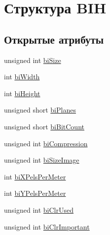 \hypertarget{struct_b_i_h}{\section{Структура B\+I\+H}
\label{struct_b_i_h}
}
\subsection*{Открытые атрибуты}
\begin{DoxyCompactItemize}
\item 
unsigned int \hyperlink{struct_b_i_h_a07c713ee07612e15f4fdca57077a8319}{bi\+Size}
\item 
int \hyperlink{struct_b_i_h_ad3ee37b4e7c1dd70c0b78deb59a0dbc6}{bi\+Width}
\item 
int \hyperlink{struct_b_i_h_a02827f70f0a626b10ea29076436704bc}{bi\+Height}
\item 
unsigned short \hyperlink{struct_b_i_h_aaa13a4d8e94f79eb8aba17dd36fbcc2c}{bi\+Planes}
\item 
unsigned short \hyperlink{struct_b_i_h_aa4aa4ed3d42e54f55121d5e072dec72a}{bi\+Bit\+Count}
\item 
unsigned int \hyperlink{struct_b_i_h_aec9ae542b9f83c9592945261d977b77e}{bi\+Compression}
\item 
unsigned int \hyperlink{struct_b_i_h_aa9e22a9c8fb71af7b24c9aa29dba1a96}{bi\+Size\+Image}
\item 
int \hyperlink{struct_b_i_h_a95644503bfbc7afda898219a4827e957}{bi\+X\+Pels\+Per\+Meter}
\item 
int \hyperlink{struct_b_i_h_a89add68a883654afa28ebe985493e355}{bi\+Y\+Pels\+Per\+Meter}
\item 
unsigned int \hyperlink{struct_b_i_h_a59ed2b0491d943593332466b0c5f9784}{bi\+Clr\+Used}
\item 
unsigned int \hyperlink{struct_b_i_h_a6ac4cd8b84b3063c67f107f47a50d684}{bi\+Clr\+Important}
\end{DoxyCompactItemize}


